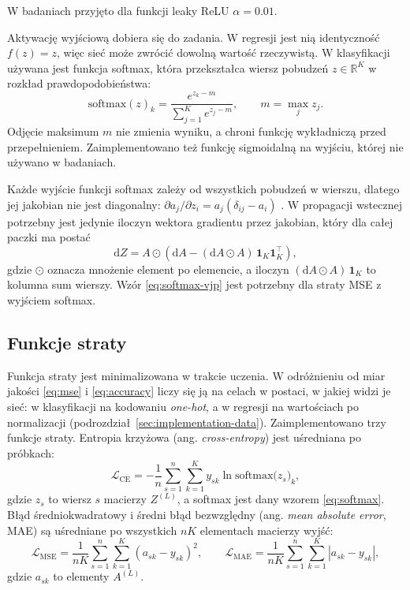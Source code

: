 W badaniach przyjęto dla funkcji leaky ReLU $\alpha = \num{0.01}$.

Aktywację wyjściową dobiera się do zadania. W regresji jest nią identyczność $f(z) = z$, więc sieć może zwrócić dowolną wartość rzeczywistą. W klasyfikacji używana jest funkcja softmax, która przekształca wiersz pobudzeń $z \in \mathbb{R}^K$ w rozkład prawdopodobieństwa:
\begin{equation}
    \mathrm{softmax}(z)_k = \frac{e^{z_k - m}}{\sum_{j=1}^{K} e^{z_j - m}}, \qquad m = \max_j z_j .
    \label{eq:softmax}
\end{equation}
Odjęcie maksimum $m$ nie zmienia wyniku, a chroni funkcję wykładniczą przed przepełnieniem. Zaimplementowano też funkcję sigmoidalną na wyjściu, której nie używano w badaniach.

Każde wyjście funkcji softmax zależy od wszystkich pobudzeń w wierszu, dlatego jej jakobian nie jest diagonalny: $\partial a_j / \partial z_i = a_j (\delta_{ij} - a_i)$ \cite[rozdz.~4.3.4]{bishop2006}. W propagacji wstecznej potrzebny jest jedynie iloczyn wektora gradientu przez jakobian, który dla całej paczki ma postać
\begin{equation}
    \mathrm{d}Z = A \odot \left( \mathrm{d}A - (\mathrm{d}A \odot A) \, \mathbf{1}_K \mathbf{1}_K^{\top} \right),
    \label{eq:softmax-vjp}
\end{equation}
gdzie $\odot$ oznacza mnożenie element po elemencie, a iloczyn $(\mathrm{d}A \odot A) \, \mathbf{1}_K$ to kolumna sum wierszy. Wzór \eqref{eq:softmax-vjp} jest potrzebny dla straty MSE z wyjściem softmax.

\subsection{Funkcje straty}
\label{sec:mlp-losses}

Funkcja straty jest minimalizowana w trakcie uczenia. W odróżnieniu od miar jakości \eqref{eq:mse} i \eqref{eq:accuracy} liczy się ją na celach w postaci, w jakiej widzi je sieć: w klasyfikacji na kodowaniu \textit{one-hot}, a w regresji na wartościach po normalizacji (podrozdział~\ref{sec:implementation-data}). Zaimplementowano trzy funkcje straty. Entropia krzyżowa (ang. \textit{cross-entropy}) jest uśredniana po próbkach:
\begin{equation}
    \mathcal{L}_{\mathrm{CE}} = -\frac{1}{n} \sum_{s=1}^{n} \sum_{k=1}^{K} y_{sk} \ln \mathrm{softmax}\big(z_s\big)_k ,
    \label{eq:loss-ce}
\end{equation}
gdzie $z_s$ to wiersz $s$ macierzy $Z^{(L)}$, a softmax jest dany wzorem \eqref{eq:softmax}. Błąd średniokwadratowy i średni błąd bezwzględny (ang. \textit{mean absolute error}, MAE) są uśredniane po wszystkich $nK$ elementach macierzy wyjść:
\begin{equation}
    \mathcal{L}_{\mathrm{MSE}} = \frac{1}{nK} \sum_{s=1}^{n} \sum_{k=1}^{K} \left( a_{sk} - y_{sk} \right)^2 ,
    \qquad
    \mathcal{L}_{\mathrm{MAE}} = \frac{1}{nK} \sum_{s=1}^{n} \sum_{k=1}^{K} \left| a_{sk} - y_{sk} \right| ,
    \label{eq:loss-mse-mae}
\end{equation}
gdzie $a_{sk}$ to elementy $A^{(L)}$.

